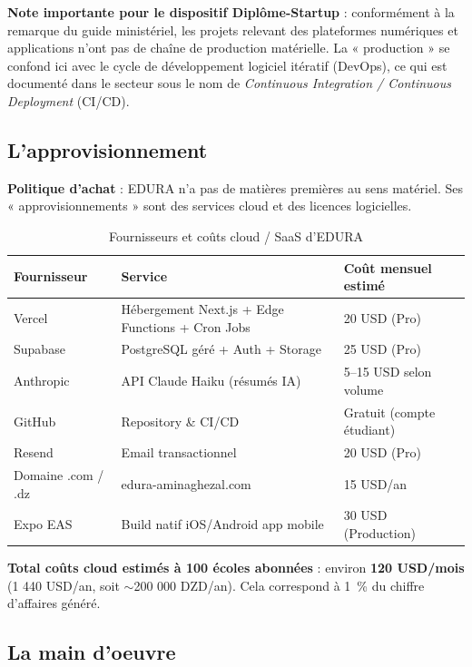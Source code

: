 \documentclass[12pt,a4paper,oneside]{report}
\begin{document}
\begin{infobox}
\textbf{Note importante pour le dispositif Diplôme-Startup} : conformément à la remarque du guide ministériel, les projets relevant des plateformes numériques et applications n'ont pas de chaîne de production matérielle. La « production » se confond ici avec le cycle de développement logiciel itératif (DevOps), ce qui est documenté dans le secteur sous le nom de \textit{Continuous Integration / Continuous Deployment} (CI/CD).
\end{infobox}

\subsection{L'approvisionnement}

\textbf{Politique d'achat} : EDURA n'a pas de matières premières au sens matériel. Ses « approvisionnements » sont des services cloud et des licences logicielles.

\begin{table}[H]
\centering
\caption{Fournisseurs et coûts cloud / SaaS d'EDURA}
\label{tab:fournisseurs}
\begin{tabularx}{\textwidth}{Xll}
\toprule
\textbf{Fournisseur} & \textbf{Service} & \textbf{Coût mensuel estimé} \\
\midrule
Vercel & Hébergement Next.js + Edge Functions + Cron Jobs & 20 USD (Pro) \\
Supabase & PostgreSQL géré + Auth + Storage & 25 USD (Pro) \\
Anthropic & API Claude Haiku (résumés IA) & 5--15 USD selon volume \\
GitHub & Repository \& CI/CD & Gratuit (compte étudiant) \\
Resend & Email transactionnel & 20 USD (Pro) \\
Domaine .com / .dz & edura-aminaghezal.com & 15 USD/an \\
Expo EAS & Build natif iOS/Android app mobile & 30 USD (Production) \\
\bottomrule
\end{tabularx}
\end{table}

\textbf{Total coûts cloud estimés à 100 écoles abonnées} : environ \textbf{120 USD/mois} (1 440 USD/an, soit $\sim$200 000 DZD/an). Cela correspond à 1~\% du chiffre d'affaires généré.

\subsection{La main d'oeuvre}
\end{document}
